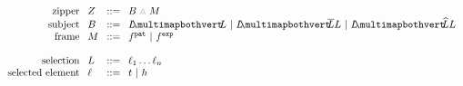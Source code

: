 \begin{figure}
  \vspace{-3px}
  \[
  \arraycolsep=4pt\begin{array}{rlrl}
    \text{zipper} & \zip & ::= & \zipper{\subject}{\zframe} \\
    \text{subject} & \subject & ::= &
      \pointing{\selection}{\selection} ~\vert~
      \selecting{\selection}{\selection}{\selection} ~\vert~
      \restructuring{\selection}{\selection}{\selection} \\
    \text{frame} & \zframe & ::= &
      \tfrelem^{\pat} ~\vert~
      \tfrelem^{\expr} \\\\


    \text{selection} & \selection & ::= &
    \selem_1\dots\selem_n \\
    \text{selected element} & \selem & ::= &
      \tile ~\vert~
      \shard \\\\



\end{array}\]
\end{figure}
